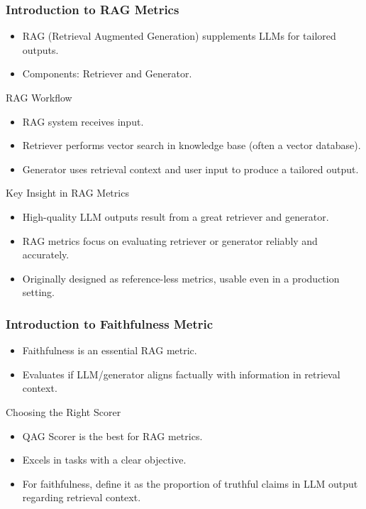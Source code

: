 \begin{frame}[fragile]\frametitle{Introduction to RAG Metrics}
  \begin{itemize}
    \item RAG (Retrieval Augmented Generation) supplements LLMs for tailored outputs.
    \item Components: Retriever and Generator.
  \end{itemize}

RAG Workflow
  \begin{itemize}
    \item RAG system receives input.
    \item Retriever performs vector search in knowledge base (often a vector database).
    \item Generator uses retrieval context and user input to produce a tailored output.
  \end{itemize}

Key Insight in RAG Metrics
  \begin{itemize}
    \item High-quality LLM outputs result from a great retriever and generator.
    \item RAG metrics focus on evaluating retriever or generator reliably and accurately.
    \item Originally designed as reference-less metrics, usable even in a production setting.
  \end{itemize}
\end{frame}

\begin{frame}[fragile]\frametitle{Introduction to Faithfulness Metric}
  \begin{itemize}
    \item Faithfulness is an essential RAG metric.
    \item Evaluates if LLM/generator aligns factually with information in retrieval context.
  \end{itemize}
  
Choosing the Right Scorer
  \begin{itemize}
    \item QAG Scorer is the best for RAG metrics.
    \item Excels in tasks with a clear objective.
    \item For faithfulness, define it as the proportion of truthful claims in LLM output regarding retrieval context.
  \end{itemize}
\end{frame}

